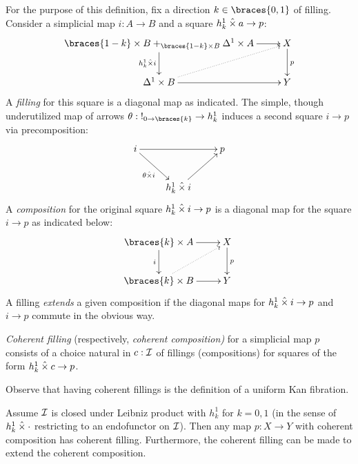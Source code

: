 \documentclass[reqno,10pt,a4paper,oneside]{amsart}
\begin{document}
\begin{definition}
For the purpose of this definition, fix a direction $k \in \braces{0, 1}$ of filling.
Consider a simplicial map $i : A \to B$ and a square $h_k^1 \hattimes a \to p$:
\[
\xymatrix{
  \braces{1-k} \times B +_{\braces{1-k} \times B} \Delta^1 \times A
  \ar[r]
  \ar[d]_{h_k^1 \hattimes i}
&
  X
  \ar[d]^{p}
\\
  \Delta^1 \times B
  \ar[r]
  \ar@{.>}[ur]
&
  Y
}
\]
A \emph{filling} for this square is a diagonal map as indicated.
The simple, though underutilized map of arrows $\theta : \canonical_{0 \to \braces{k}} \to h_k^1$ induces a second square $i \to p$ via precomposition:
\[
\xymatrix{
  i
  \ar[rr]
  \ar[dr]_{\theta \hattimes i}
&&
  p
\\&
  h_k^1 \hattimes i
  \ar[ur]
}
\]
A \emph{composition} for the original square $h_k^1 \hattimes i \to p$ is a diagonal map for the square $i \to p$ as indicated below:
\[
\xymatrix{
  \braces{k} \times A
  \ar[r]
  \ar[d]_{i}
&
  X
  \ar[d]^{p}
\\
  \braces{k} \times B
  \ar[r]
  \ar@{.>}[ur]
&
  Y
}
\]
A filling \emph{extends} a given composition if the diagonal maps for $h_k^1 \hattimes i \to p$ and $i \to p$ commute in the obvious way.
\end{definition}

\begin{definition}
\emph{Coherent filling} (respectively, \emph{coherent composition)} for a simplicial map $p$ consists of a choice natural in $c : \cal{I}$ of fillings (compositions) for squares of the form $h_k^1 \hattimes c \to p$.
\end{definition}

Observe that having coherent fillings is the definition of a uniform Kan fibration.

\begin{lemma}
Assume $\cal{I}$ is closed under Leibniz product with $h_k^1$ for $k = 0, 1$ (in the sense of $h_k^1 \hattimes \arghole$ restricting to an endofunctor on $\cal{I}$).
Then any map $p : X \to Y$ with coherent composition has coherent filling.
Furthermore, the coherent filling can be made to extend the coherent composition.
\end{lemma}
\end{document}
